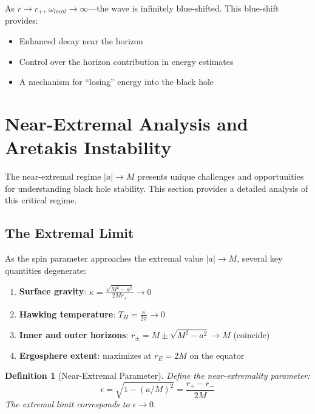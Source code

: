 \documentclass[12pt,a4paper]{article}
\newtheorem{definition}[theorem]{Definition}
\begin{document}
As $r \to r_+$, $\omega_{local} \to \infty$---the wave is infinitely blue-shifted. This blue-shift provides:
\begin{itemize}
    \item Enhanced decay near the horizon
    \item Control over the horizon contribution in energy estimates
    \item A mechanism for ``losing'' energy into the black hole
\end{itemize}

\section{Near-Extremal Analysis and Aretakis Instability}

The near-extremal regime $|a| \to M$ presents unique challenges and opportunities for understanding black hole stability. This section provides a detailed analysis of this critical regime.

\subsection{The Extremal Limit}

As the spin parameter approaches the extremal value $|a| \to M$, several key quantities degenerate:

\begin{enumerate}
    \item \textbf{Surface gravity}: $\kappa = \frac{\sqrt{M^2 - a^2}}{2Mr_+} \to 0$
    \item \textbf{Hawking temperature}: $T_H = \frac{\kappa}{2\pi} \to 0$
    \item \textbf{Inner and outer horizons}: $r_\pm = M \pm \sqrt{M^2 - a^2} \to M$ (coincide)
    \item \textbf{Ergosphere extent}: maximizes at $r_E = 2M$ on the equator
\end{enumerate}

\begin{definition}[Near-Extremal Parameter]
Define the near-extremality parameter:
\begin{equation}
\epsilon = \sqrt{1 - (a/M)^2} = \frac{r_+ - r_-}{2M}
\end{equation}
The extremal limit corresponds to $\epsilon \to 0$.
\end{definition}
\end{document}
